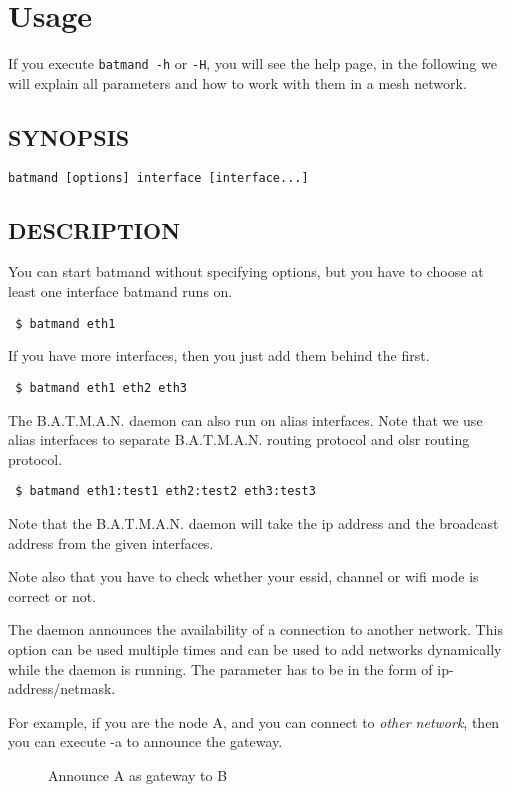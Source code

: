 \section{Usage}
If you execute \verb+batmand -h+ or \verb+-H+, you will see the help page, in
the following we will explain all parameters and how to work with them in a mesh
network.

\subsection{SYNOPSIS}
\begin{verbatim}
batmand [options] interface [interface...]
\end{verbatim}


\subsection{DESCRIPTION}
You can start batmand without specifying options, but you have to choose at
least one interface batmand runs on.
\begin{verbatim}
 $ batmand eth1
\end{verbatim}
If you have more interfaces, then you just add them behind the first.
\begin{verbatim}
 $ batmand eth1 eth2 eth3
\end{verbatim}
The B.A.T.M.A.N. daemon can also run on alias interfaces. Note that we use alias
interfaces to separate B.A.T.M.A.N. routing protocol and olsr routing protocol.
\begin{verbatim}
 $ batmand eth1:test1 eth2:test2 eth3:test3
\end{verbatim}
Note that the B.A.T.M.A.N. daemon will take the ip address and the broadcast
address from the given interfaces.

Note also that you have to check whether your essid, channel or wifi mode is
correct or not.

The daemon announces the availability of a connection to another network. This
option can be used multiple times and can be used to add networks dynamically
while the daemon is running. The parameter has to be in the form of
ip-address/netmask.

For example, if you are the node A, and you can connect to \emph{other
network}, then you can execute -a to announce the gateway.

\begin{figure}[H]
 \begin{center}
   
  \end{center}
  \caption{Announce A as gateway to B}
\end{figure}

